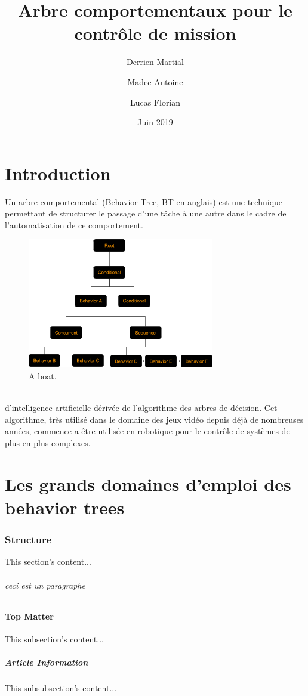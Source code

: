 \documentclass[titlepage]{article}
\title{Arbre comportementaux pour le contr\^ole de mission}
\author{
	Derrien Martial \\
	\and
	Madec Antoine \\
	\and
	Lucas Florian
}
\date{Juin 2019}
\begin{document}
	\maketitle
	\tableofcontents
	\hypersetup{linktocpage}
	
	\clearpage
	\part{Introduction}
	Un arbre comportemental (Behavior Tree, BT en anglais) est une
	technique permettant de structurer le passage d'une tâche à une autre dans 
	le cadre de l'automatisation de ce comportement. \cite{colledanchise_ogren_2018}
	\\
	\begin{figure}[h!]
		\includegraphics[width=\linewidth]{img/behavior_trees_example.png}
		\caption{A boat.}
		\label{fig:boat1}
	\end{figure}
	\\
	d’intelligence artificielle dérivée de l’algorithme des arbres
	de décision. \cite{rasmussen}
	Cet algorithme, très utilisé dans le domaine des jeux
	vidéo depuis déjà de nombreuses années, commence a être utilisée en
	robotique pour le contrôle de systèmes de plus en plus complexes.
	
	\clearpage
	\part{Les grands domaines d'emploi des behavior trees}
	\section{Structure}
	This section's content...
	\paragraph{ceci est un paragraphe}	
	\subsection{Top Matter}
	This subsection's content...
	\subsubsection{Article Information}
	This subsubsection's content...
	
	\clearpage
	
	
	
\end{document}
